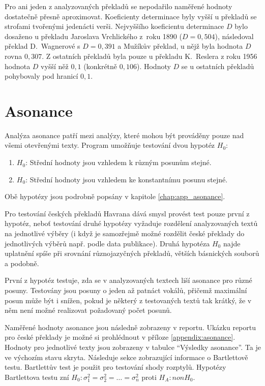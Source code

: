 \documentclass[dp.tex]{subfiles}
\begin{document}
Pro ani jeden z analyzovaných překladů se nepodařilo naměřené hodnoty dostatečně přesně aproximovat. Koeficienty determinace byly vyšší u překladů se strofami tvořenými jedenácti verši. Nejvyššího koeficientu determinace $D$ bylo dosaženo u překladu Jaroslava Vrchlického z~roku 1890 ($D = 0{,}504$), následoval překlad D.~Wagnerové s $D = 0{,}391$ a Mužíkův překlad, u nějž byla hodnota $D$ rovna $0{,}307$. Z ostatních překladů byla pouze u překladu K.~Reslera z roku 1956 hodnota $D$ vyšší něž $0{,}1$ (konkrétně $0{,}106$). Hodnoty $D$ se u ostatních překladů pohybovaly pod hranicí $0{,}1$.

\section{Asonance}

Analýza asonance patří mezi analýzy, které mohou být prováděny pouze nad všemi otevřenými texty. Program umožňuje testování dvou hypotéz $H_0$:
\begin{enumerate}
\item $H_0$: Střední hodnoty jsou vzhledem k různým posunům stejné.
\item $H_0$: Střední hodnoty jsou vzhledem ke konstantnímu posunu stejné.
\end{enumerate}
Obě hypotézy jsou podrobně popsány v kapitole \ref{chap:app_asonance}.

Pro testování českých překladů Havrana dává smysl provést test pouze první z hypotéz, neboť testování druhé hypotézy vyžaduje rozdělení analyzovaných textů na jednotlivé výběry (i když je samozřejmě možné rozdělit české překlady do jednotlivých výběrů např. podle data publikace). Druhá hypotéza $H_0$ najde uplatnění spíše při srovnání různojazyčných překladů, větších básnických souborů a podobně.

První z hypotéz testuje, zda se v analyzovaných textech liší asonance pro různé posuny. Testovány jsou posuny o jeden až patnáct vokálů, přičemž maximální posun může být i snížen, pokud je některý z testovaných textů tak krátký, že v něm není možné realizovat požadovaný počet posunů.

Naměřené hodnoty asonance jsou následně zobrazeny v reportu. Ukázku reportu pro české překlady je možné si prohlédnout v příloze \ref{appendix:asonance}. Hodnoty pro jednotlivé texty jsou zobrazeny v tabulce \enquote{Výsledky asonance}. Ta je ve výchozím stavu skryta. Následuje sekce zobrazující informace o Bartlettově testu. Bartlettův test je použit pro testování shody rozptylů. Hypotézy Bartlettova testu zní $H_0: \sigma^2_1 = \sigma^2_2 = \dots = \sigma^2_n$ proti $H_A: non H_0$.
\end{document}
